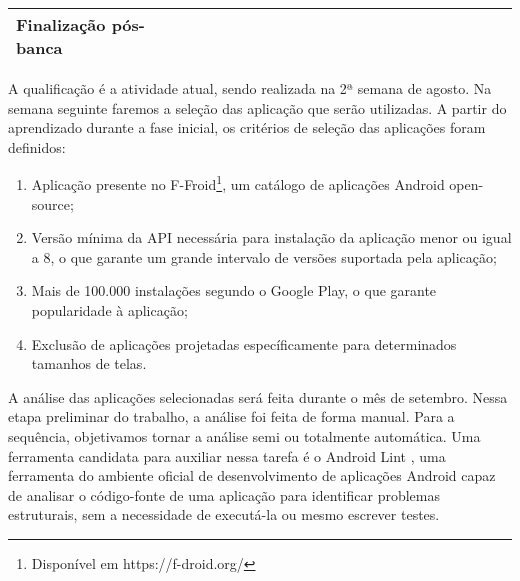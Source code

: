 \begin{table}[ht]
\begin{tabular}{|l|l|l|l|l|l|l|l|l|l|l|l|l|l|l|l|l|l|l|l|l|}
Finalização pós-banca  &  &                                                 &                          &                          &                          &                          &                          &                          &                          &                          &                          &                          &                          &                          &                          &                          &                          &                          & \cellcolor[HTML]{C0C0C0} & \cellcolor[HTML]{C0C0C0} \\ \hline
\end{tabular}
\end{table}

A qualificação é a atividade atual, sendo realizada na 2ª semana de agosto.
Na semana seguinte faremos a seleção das aplicação que serão utilizadas. A partir
do aprendizado durante a fase inicial, os critérios de seleção das aplicações foram definidos:
\begin{enumerate}
    \item Aplicação presente no F-Froid\footnote{Disponível em https://f-droid.org/},
        um catálogo de aplicações Android open-source;
    \item Versão mínima da API necessária para instalação da aplicação menor ou
        igual a 8,
        o que garante um grande intervalo de versões suportada pela aplicação;
    \item Mais de 100.000 instalações segundo o Google Play, o que garante
        popularidade à aplicação;
    \item Exclusão de aplicações projetadas específicamente para determinados
        tamanhos de telas.
\end{enumerate}

A análise das aplicações selecionadas será feita durante o mês de setembro. Nessa
etapa preliminar do trabalho, a análise foi feita de forma manual. Para a sequência,
objetivamos  tornar a análise semi ou totalmente automática. Uma ferramenta candidata
para auxiliar nessa tarefa é o Android Lint \cite{Lint}, uma ferramenta do ambiente oficial
de desenvolvimento de aplicações Android capaz de analisar o código-fonte de uma
aplicação para identificar problemas estruturais, sem a necessidade de executá-la
ou mesmo escrever testes.

